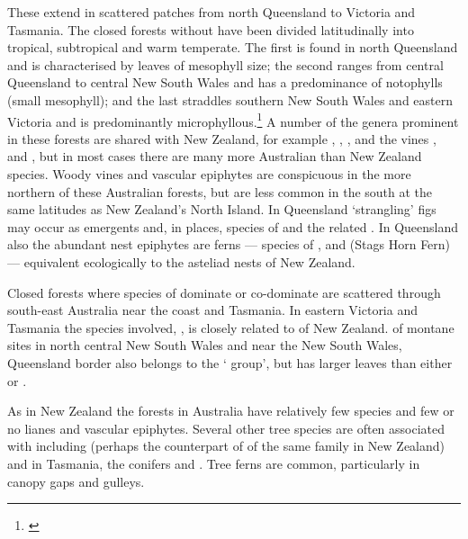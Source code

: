 These extend in scattered patches from north Queensland to Victoria and Tasmania.
The closed forests without  have been divided latitudinally into tropical, subtropical and warm temperate.
The first is found in north Queensland and is characterised by leaves of mesophyll size; the second ranges from central Queensland to central New South Wales and has a predominance of notophylls (small mesophyll); and the last straddles southern New South Wales and eastern Victoria and is predominantly microphyllous.\footnote{\cite{webb1959physiognomic}}
A number of the genera prominent in these forests are shared with New Zealand, for example , , ,  and the vines ,  and , but in most cases there are many more Australian than New Zealand species.
Woody vines and vascular epiphytes are conspicuous in the more northern of these Australian forests, but are less common in the south at the same latitudes as New Zealand's North Island.
In Queensland `strangling' figs may occur as emergents and, in places, species of  and the related .
In Queensland also the abundant nest epiphytes are ferns — species of ,  and  (Stags Horn Fern) — equivalent ecologically to the asteliad nests of New Zealand.

Closed forests where species of  dominate or co-dominate are scattered through south-east Australia near the coast and Tasmania.
In eastern Victoria and Tasmania the species involved, , is closely related to  of New Zealand.  of montane sites in north central New South Wales and near the New South Wales, Queensland border also belongs to the ` group', but has larger leaves than either  or .

As in New Zealand the  forests in Australia have relatively few species and few or no lianes and vascular epiphytes.
Several other tree species are often associated with  including  (perhaps the counterpart of  of the same family in New Zealand)  and in Tasmania, the conifers  and .
Tree ferns are common, particularly in canopy gaps and gulleys.

